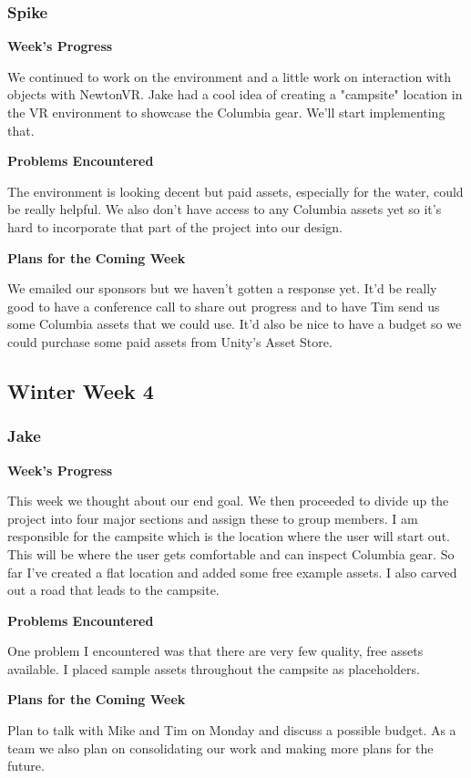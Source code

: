 \documentclass[10pt,journal,compsoc,onecolumn, draftclsnofoot]{IEEEtran}
\begin{document}
\subsubsection{Spike}
\noindent \textbf{Week's Progress}

We continued to work on the environment and a little work on interaction with objects with NewtonVR. Jake had a cool idea of creating a "campsite" location in the VR environment to showcase the Columbia gear. We'll start implementing that.

\noindent \textbf{Problems Encountered}

The environment is looking decent but paid assets, especially for the water, could be really helpful. We also don't have access to any Columbia assets yet so it's hard to incorporate that part of the project into our design.

\noindent \textbf{Plans for the Coming Week}

We emailed our sponsors but we haven't gotten a response yet. It'd be really good to have a conference call to share out progress and to have Tim send us some Columbia assets that we could use. It'd also be nice to have a budget so we could purchase some paid assets from Unity's Asset Store.

\subsection{Winter Week 4}
\subsubsection{Jake}
\noindent \textbf{Week's Progress}

This week we thought about our end goal. We then proceeded to divide up the project into four major sections and assign these to group members. I am responsible for the campsite which is the location where the user will start out. This will be where the user gets comfortable and can inspect Columbia gear. So far I've created a flat location and added some free example assets. I also carved out a road that leads to the campsite.

\noindent \textbf{Problems Encountered}

One problem I encountered was that there are very few quality, free assets available. I placed sample assets throughout the campsite as placeholders.

\noindent \textbf{Plans for the Coming Week}

Plan to talk with Mike and Tim on Monday and discuss a possible budget. As a team we also plan on consolidating our work and making more plans for the future.
\end{document}
